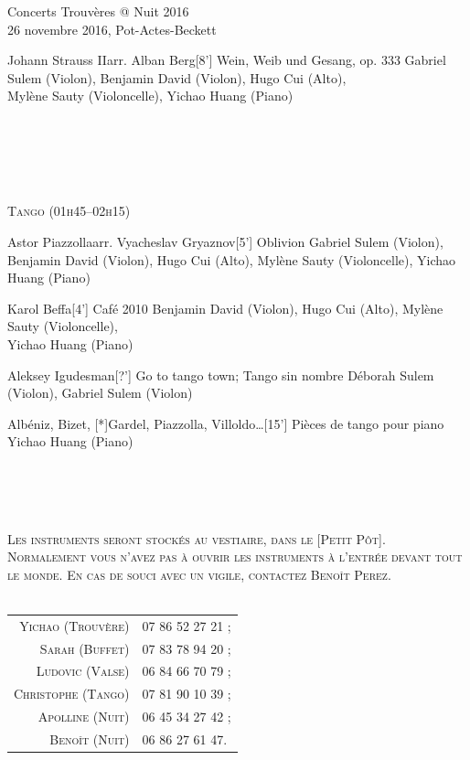 \documentclass[a4paper,11pt,poets,durations]{ConcProg}
\begin{document}
{\begin{programme}{
    Concerts Trouvères @ Nuit 2016
\\  {\normalsize 26 novembre 2016, Pot-Actes-Beckett}
}
\begin{part}[]
\begin{composition}{Johann Strauss II}{arr. Alban Berg}{[8'] Wein, Weib und Gesang, op. 333}{}
      {\small Gabriel Sulem (Violon), Benjamin David (Violon), Hugo Cui (Alto),\\Mylène Sauty (Violoncelle), Yichao Huang (Piano)}
    \end{composition}\\
~\\
~\\
~\\
\begin{center}
\textsc{Tango (01h45--02h15)}
\end{center}
    \begin{composition}{Astor Piazzolla}{arr. Vyacheslav Gryaznov}{[5'] Oblivion}{}
      {\small Gabriel Sulem (Violon), Benjamin David (Violon), Hugo Cui (Alto), Mylène Sauty (Violoncelle), Yichao Huang (Piano)}
    \end{composition}
    \begin{composition}{Karol Beffa}{}{[4'] Café 2010}{}
      {\small Benjamin David (Violon), Hugo Cui (Alto), Mylène Sauty (Violoncelle),\\Yichao Huang (Piano)}
    \end{composition}
    \begin{composition}{Aleksey Igudesman}{}{[?'] Go to tango town; Tango sin nombre}{}
      {\small Déborah Sulem (Violon), Gabriel Sulem (Violon)}
    \end{composition}
    \begin{composition}{Albéniz, Bizet, [*]Gardel, Piazzolla, Villoldo\dots}{}{[15'] Pièces de tango pour piano}{}
      {\small Yichao Huang (Piano)}
    \end{composition}\\
~\\
~\\
\begin{center}
\textsc{Les instruments seront stockés au vestiaire, dans le [Petit Pôt].\\Normalement vous n'avez pas à ouvrir les instruments à l'entrée devant tout le monde. En cas de souci avec un vigile, contactez Benoît Perez.}\\
~\\
\begin{tabular}{rl}
\textsc{Yichao (Trouvère)} & \textsc{07 86 52 27 21 ;}\\
\textsc{Sarah (Buffet)} & \textsc{07 83 78 94 20 ;}\\
\textsc{Ludovic (Valse)} & \textsc{06 84 66 70 79 ;}\\
\textsc{Christophe (Tango)} & \textsc{07 81 90 10 39 ;}\\
\textsc{Apolline (Nuit)} & \textsc{06 45 34 27 42 ;}\\
\textsc{Benoît (Nuit)} & \textsc{06 86 27 61 47.}
\end{tabular}
\end{center}
  \end{part}
\end{programme}
}
\end{document}
